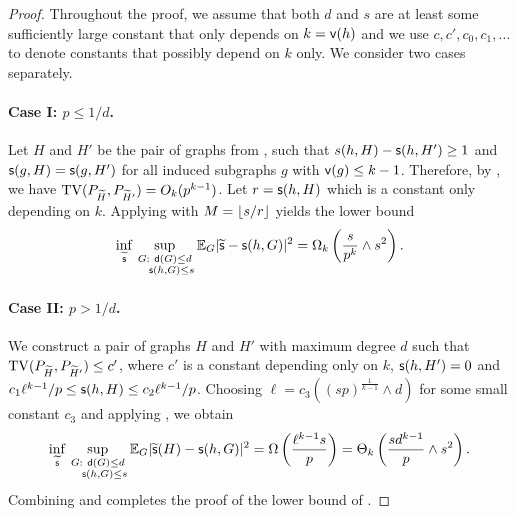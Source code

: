 \begin{proof}
Throughout the proof, we assume that both $d$ and $s$ are at least some sufficiently large constant that only depends on $k={\mathsf{v}}(h)$ and we use $c,c',c_0,c_1,\ldots$ to denote constants that possibly depend on $k$ only.
We consider two cases separately.
\paragraph{Case I: $ p \leq 1/d $.}

Let $H$ and $H'$ be the pair of graphs from , such that $s(h,H)-\mathsf{s}(h,H')\geq 1$ and 
$\mathsf{s}(g,H)=\mathsf{s}(g,H')$ for all induced subgraphs $g$ with ${\mathsf{v}}(g) \leq k-1$.
Therefore, by , we have $ {\rm TV}(P_{{\widetilde{H}}}, P_{{\widetilde{H}}'}) = O_{k}(p^{k-1})$. 
Let $r = \mathsf{s}(h,H)$ which is a constant only depending on $k$.
Applying  with $M = {\left\lfloor {s / r} \right \rfloor}$ yields the lower bound
\begin{equation}
\inf_{\widetilde{\mathsf{s}}} \sup_{\substack{G: ~{\mathsf{d}}(G)\leq d\\ ~~~\mathsf{s}(h,G) \leq s}} \mathbb{E}_G|\widetilde{\mathsf{s}}-\mathsf{s}(h, G)|^2 
= \Omega_{k} \left( \frac{s}{p^{k}} \wedge s^2 \right).
\label{eq:subgraphlb1}
\end{equation}


	
\paragraph{Case II: $ p > 1/d $.}
We construct a pair of graphs $H$ and $H'$  with maximum degree $d$ such that ${\rm TV}(P_{{\widetilde{H}}}, P_{{\widetilde{H}}'}) \leq c'$, where $ c' $ is a constant depending only on $ k $, 
$\mathsf{s}(h,H')=0$ and $c_1 \ell^{k-1}/p \leq \mathsf{s}(h,H) \leq c_2 \ell^{k-1}/p$.
Choosing $\ell = c_3 ((sp)^{\frac{1}{k-1}}  \wedge d)$ for some small constant $c_3$ and applying , we obtain
\begin{equation}
\inf_{\widetilde{\mathsf{s}}} \sup_{\substack{G: ~{\mathsf{d}}(G)\leq d\\ ~~~\mathsf{s}(h,G) \leq s}} \mathbb{E}_G|\widetilde{\mathsf{s}}(H)-\mathsf{s}(h, G)|^2 
= \Omega\left( \frac{\ell^{k-1} s }{p} \right)  = \Theta_{k} \left( \frac{sd^{k-1}}{p} \wedge s^2 \right).
\label{eq:subgraphlb2}
\end{equation}
Combining  and  completes the proof of the lower bound of . 


\end{proof}
